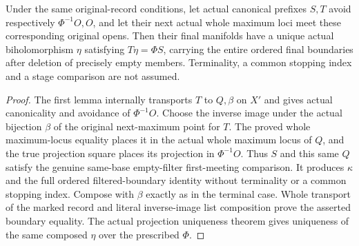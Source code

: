 \begin{theorem}
\label{hir:original-empty-boundary-first-meeting-base-comparison}
\leanok
Under the same original-record conditions, let actual canonical prefixes
$S,T$ avoid respectively $\Phi^{-1}O,O$, and let their next actual whole
maximum loci meet these corresponding original opens. Then their final
manifolds have a unique actual biholomorphism $\eta$ satisfying
$T\eta=\Phi S$, carrying the entire ordered final boundaries after
deletion of precisely empty members. Terminality, a common stopping
index and a stage comparison are not assumed.
\end{theorem}
\begin{proof}
The first lemma internally transports $T$ to $Q,\beta$ on $X'$ and gives
actual canonicality and avoidance of $\Phi^{-1}O$. Choose the inverse
image under the actual bijection $\beta$ of the original next-maximum
point for $T$. The proved whole maximum-locus equality places it in the
actual whole maximum locus of $Q$, and the true projection square places
its projection in $\Phi^{-1}O$. Thus $S$ and this same $Q$ satisfy the
genuine same-base empty-filter first-meeting comparison. It produces
$\kappa$ and the full ordered filtered-boundary identity without
terminality or a common stopping index. Compose with $\beta$ exactly as
in the terminal case. Whole transport of the marked record and literal
inverse-image list composition prove the asserted boundary equality.
The actual projection uniqueness theorem gives uniqueness of the same
composed $\eta$ over the prescribed $\Phi$.
\end{proof}
